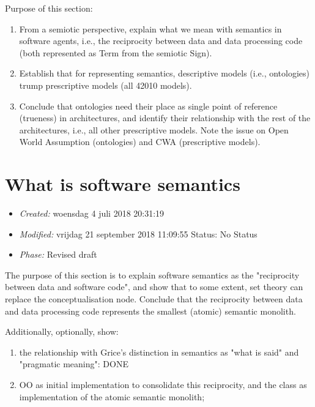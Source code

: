 \documentclass[a4paper,11pt,oneside,oldfontcommands]{memoir}
\theoremstyle{definition}
\theoremstyle{break}		%
\numberwithin{equation}{chapter}
\numberwithin{figure}{chapter}
\begin{document}
\begin{synopsis}
Purpose of this section: 
\begin{enumerate}
\item From a semiotic perspective, explain what we mean with semantics in software agents, i.e., the reciprocity between data and data processing code (both represented as Term from the semiotic Sign).
\item Establish that for representing semantics, descriptive models (i.e., ontologies) trump prescriptive models (all 42010 models).
\item Conclude that ontologies need their place as single point of reference (trueness) in architectures, and identify their relationship with the rest of the architectures, i.e., all other prescriptive models. Note the issue on Open World Assumption (ontologies) and CWA (prescriptive models).
\end{enumerate}

\end{synopsis}

\hypertarget{what-is-software-semantics}{%
\section{What is software semantics}\label{what-is-software-semantics}}

\begin{itemize}
\tightlist
\item
  \emph{Created:} woensdag 4 juli 2018 20:31:19
\item
  \emph{Modified:} vrijdag 21 september 2018 11:09:55 Status: No Status
\item
  \emph{Phase:} Revised draft
\end{itemize}

\begin{synopsis}
The purpose of this section is to explain software semantics as the "reciprocity between data and software code", and show that to some extent, set theory can replace the conceptualisation node.
Conclude that the reciprocity between data and data processing code represents the smallest (atomic) semantic monolith.

Additionally, optionally, show:
\begin{enumerate}
\item the relationship with Grice's distinction in semantics as "what is said" and "pragmatic meaning": DONE
\item OO as initial implementation to consolidate this reciprocity, and the class as implementation of the atomic semantic monolith; 
\end{enumerate}

\end{synopsis}
\end{document}
